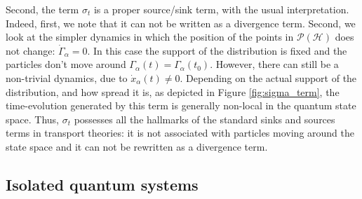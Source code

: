 \documentclass[draft,nofootinbib,pre,twocolumn,showpacs,showkeys,preprintnumbers,floatfix]{revtex4-1}
\newcommand{\1}{\mathbbm{1}}
\newcommand{\PH}{\mathcal{P}(\mathcal{H})}
\begin{document}
Second, the term $\sigma_t$ is a proper source/sink term, with the usual interpretation. Indeed, first, we note that it
can not be written as a divergence term. Second, we look at the simpler dynamics in which the position of the points 
in $\PH$ does not change: $\dot{\Gamma}_\alpha = 0$. In this case the support of the distribution is fixed and the 
particles don't move around $\Gamma_\alpha(t)=\Gamma_\alpha(t_0)$. However, there can still be a non-trivial 
dynamics, due to $\dot{x}_\alpha(t)\neq 0$. Depending on the actual support of the distribution, and how spread it is, 
as depicted in Figure \ref{fig:sigma_term}, the time-evolution generated by this term is generally non-local in the 
quantum state space. Thus, $\sigma_t$ possesses all the hallmarks of the standard sinks and sources terms in 
transport theories: it is not associated with particles moving around the state space and it can not be rewritten 
as a divergence term.


\subsection{Isolated quantum systems}\label{subsec:IQS}
\end{document}
